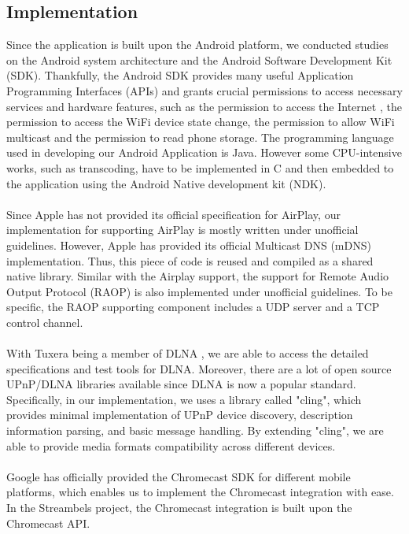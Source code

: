\subsection{Implementation}
Since the application is built upon the Android platform, we conducted studies on the Android system architecture and the Android Software Development Kit (SDK). Thankfully, the Android SDK provides many useful Application Programming Interfaces (APIs) and grants crucial permissions to access necessary services and hardware features, such as the permission to access the Internet , the permission to access the WiFi device state change, the permission to allow WiFi multicast and  the permission to read phone storage. The programming language used in developing our Android Application is Java. However some CPU-intensive works, such as transcoding, have to be implemented in C and then embedded to the application using the Android Native development kit (NDK).\\
\\
Since Apple has not provided its official specification for AirPlay, our implementation for supporting AirPlay is mostly written under unofficial guidelines. However, Apple has provided its official Multicast DNS (mDNS) implementation. Thus, this piece of code is reused and compiled as a shared native library. Similar with the Airplay support, the support for Remote Audio Output Protocol (RAOP) is
 also implemented under unofficial guidelines. To be specific, the RAOP supporting component includes a UDP server and a TCP control channel.\\
\\
With Tuxera being a member of DLNA , we are able to access the detailed specifications and test tools for DLNA. Moreover,  there are a lot of open source UPnP/DLNA
 libraries available since DLNA is now a popular standard. Specifically, in our
 implementation, we uses a library called "cling"\cite{cling}, which provides minimal implementation of UPnP device discovery, description information parsing, and basic message handling. By extending "cling"\cite{cling}, we are able to provide media formats compatibility across different devices.\\
\\
Google has officially provided the Chromecast SDK for different mobile platforms, which enables us to  implement the Chromecast integration with ease. In the Streambels project, the Chromecast integration is built upon the Chromecast API.\\
\\
